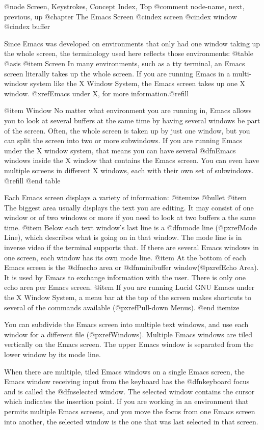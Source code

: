 @node Screen, Keystrokes, Concept Index, Top
@comment  node-name,  next,  previous,  up
@chapter The Emacs Screen
@cindex screen
@cindex window
@cindex buffer

Since Emacs was developed on environments that only had one window
taking up the whole screen, the terminology used here reflects those
environments: 
@table @asis
@item Screen
In many environments, such as a tty terminal, an Emacs screen
literally takes up the whole screen.  If you are
running Emacs in a multi-window system like the X Window System, the
Emacs screen takes up one X window.  @xref{Emacs under X}, for more
information.@refill

@item Window
No matter what environment you are running in, Emacs allows you to look
at several buffers at the same time by having several windows be part of
the screen.  Often, the whole screen is taken up by just one window, but
you can split the screen into two or more subwindows.  If you are
running Emacs under the X window system, that means you can have several
@dfn{Emacs windows} inside the X window that contains the Emacs screen.
You can even have multiple screens in different X windows, each with
their own set of subwindows. 
@refill
@end table

Each Emacs screen displays a variety of information: 
@itemize @bullet
@item
The biggest area usually displays the text you are editing.  It may
consist of one window or of two windows or more if you need to look at two
buffers a the same time. 
@item
Below each text window's last line is a @dfn{mode line} (@pxref{Mode
Line}), which describes what is going on in that window.  The mode line
is in inverse video if the terminal supports that.  If there are several
Emacs windows in one screen, each window has its own mode line.
@item
At the bottom of each Emacs screen is the @dfn{echo area} or @dfn{minibuffer
window}(@pxref{Echo Area}).  It is used by Emacs to exchange information
with the user.  There is only one echo area per Emacs screen.
@item
If you are running Lucid GNU  Emacs under the X Window System, a
menu bar at the top of the screen makes shortcuts to several of the
commands available (@pxref{Pull-down Menus}).
@end itemize

  You can subdivide the Emacs screen into multiple text windows, and use
each window for a different file (@pxref{Windows}).  Multiple Emacs
windows are tiled vertically on the Emacs screen.  The upper Emacs window
is separated from the lower window by its mode line.

  When there are multiple, tiled Emacs windows on a single Emacs screen,
the Emacs window receiving input from the keyboard has the @dfn{keyboard
focus} and is called the @dfn{selected window}.  The selected window
contains the cursor which indicates the insertion point.  If you are
working in an environment that permits multiple Emacs screens, and you
move the focus from one Emacs screen into another, the
selected window is the one that was last selected in that screen.


